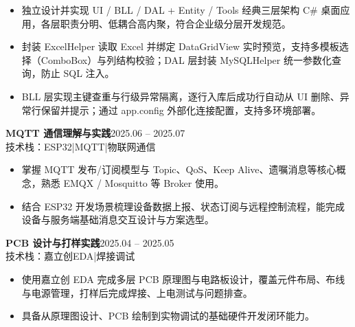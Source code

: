 \documentclass[10pt,a4paper]{article}
\newcommand{\projectblock}[3]{%
    {\bfseries\color{darktext}#1}\hfill{\color{graytext}#2}\\%
    {\small\color{graytext}#3}%
    \vspace{0.2em}%
}
\begin{document}
\begin{itemize}[leftmargin=1.5em, itemsep=2pt, parsep=0pt, topsep=2pt]
    \item 独立设计并实现 UI / BLL / DAL + Entity / Tools 经典三层架构 C\# 桌面应用，各层职责分明、低耦合高内聚，符合企业级分层开发规范。
    \item 封装 ExcelHelper 读取 Excel 并绑定 DataGridView 实时预览，支持多模板选择（ComboBox）与列结构校验；DAL 层封装 MySQLHelper 统一参数化查询，防止 SQL 注入。
    \item BLL 层实现主键查重与行级异常隔离，逐行入库后成功行自动从 UI 删除、异常行保留并提示；通过 app.config 外部化连接配置，支持多环境部署。
\end{itemize}

\vspace{0.15em}

\projectblock{MQTT 通信理解与实践}{2025.06 -- 2025.07}{技术栈：ESP32\hspace{0.3em}|\hspace{0.3em}MQTT\hspace{0.3em}|\hspace{0.3em}物联网通信}

\begin{itemize}[leftmargin=1.5em, itemsep=2pt, parsep=0pt, topsep=2pt]
    \item 掌握 MQTT 发布/订阅模型与 Topic、QoS、Keep Alive、遗嘱消息等核心概念，熟悉 EMQX / Mosquitto 等 Broker 使用。
    \item 结合 ESP32 开发场景梳理设备数据上报、状态订阅与远程控制流程，能完成设备与服务端基础消息交互设计与方案选型。
\end{itemize}

\vspace{0.15em}

\projectblock{PCB 设计与打样实践}{2025.04 -- 2025.05}{技术栈：嘉立创EDA\hspace{0.3em}|\hspace{0.3em}焊接调试}

\begin{itemize}[leftmargin=1.5em, itemsep=2pt, parsep=0pt, topsep=2pt]
    \item 使用嘉立创 EDA 完成多层 PCB 原理图与电路板设计，覆盖元件布局、布线与电源管理，打样后完成焊接、上电测试与问题排查。
    \item 具备从原理图设计、PCB 绘制到实物调试的基础硬件开发闭环能力。
\end{itemize}

\vspace{0.15em}
\end{document}
